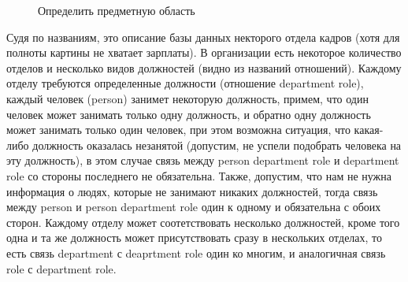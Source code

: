 \documentclass[a4paper,12pt]{article}
\begin{document}
\begin{figure}[h]
	\noindent{}
	\caption{Определить предметную область}
	\label{pic::schema}
\end{figure}

Судя по названиям, это описание базы данных некторого отдела кадров (хотя для полноты картины не хватает зарплаты). В организации есть некоторое количество отделов и несколько видов должностей (видно из названий отношений). Каждому отделу требуются определенные должности (отношение department role), каждый человек (person) занимет некоторую должность, примем, что один человек может занимать только одну должность, и обратно одну должность может занимать только один человек, при этом возможна ситуация, что какая-либо должность оказалась незанятой (допустим, не успели подобрать человека на эту должность), в этом случае связь между person department role и department role со стороны последнего не обязательна. Также, допустим, что нам не нужна информация о людях, которые не занимают никаких должностей, тогда связь между person и person department role один к одному и обязательна с обоих сторон. Каждому отделу может соотетствовать несколько должностей, кроме того одна и та же должность может присутствовать сразу в нескольких отделах, то есть связь department с deaprtment role один ко многим, и аналогичная связь role с department role.
\end{document}
